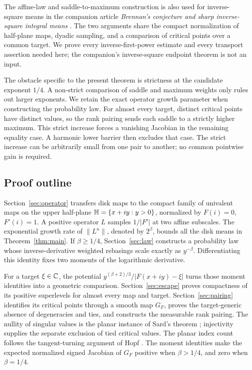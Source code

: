 The affine-law and saddle-to-maximum construction is also used for
inverse-square means in the companion article
\emph{Brennan's conjecture and sharp inverse-square integral means}
\cite{BrennanMethod}. The two arguments share the compact
normalization of half-plane maps, dyadic sampling, and a comparison
of critical points over a common target. We prove every
inverse-first-power estimate and every transport assertion needed
here; the companion's inverse-square endpoint theorem is not an
input.

The obstacle specific to the present theorem is strictness at the
candidate exponent \(1/4\). A non-strict comparison of saddle and
maximum weights only rules out larger exponents. We retain the exact
operator growth parameter when constructing the probability law.
For almost every target, distinct critical points have distinct
values, so the rank pairing sends each saddle to a strictly higher
maximum. This strict increase forces a vanishing Jacobian in the
remaining equality case. A harmonic lower barrier then excludes
that case. The strict increase can be arbitrarily small from one
pair to another; no common pointwise gain is required.

\subsection{Proof outline}

Section~\ref{sec:operator} transfers disk maps to the compact family
of univalent maps on the upper half-plane \(\mathbb H=\{x+iy:y>0\}\),
normalized by \(F(i)=0\),
\(F'(i)=1\). A positive operator \(L\) samples \(1/|F'|\) at two
affine subscales. The exponential growth rate of \(\|L^n\|\), denoted
by \(2^\beta\), bounds all the disk means in Theorem~\ref{thm:main}.
If \(\beta\ge1/4\), Section~\ref{sec:law} constructs a probability
law whose inverse-derivative weighted rebasings scale exactly as
\(y^{-\beta}\). Differentiating this identity fixes two moments of
the logarithmic derivative.

For a target \(\xi\in\mathbb C\), the potential
\(y^{(\beta+2)/3}/|F(x+iy)-\xi|\) turns those moment identities into
a geometric comparison. Section~\ref{sec:escape} proves compactness
of its positive superlevels for almost every map and target.
Section~\ref{sec:pairing} identifies its critical points through a
smooth map \(G_F\), proves the target-generic absence of degeneracies
and ties, and constructs the measurable rank pairing. The nullity of singular
values is the planar instance of Sard's theorem \cite{Sard}; injectivity
supplies the separate exclusion of tied critical values. The planar
index count follows the tangent-turning argument of Hopf \cite{Hopf}.
The moment identities make the expected normalized signed Jacobian
of \(G_F\) positive when \(\beta>1/4\), and zero when \(\beta=1/4\).

